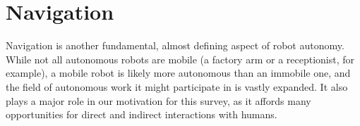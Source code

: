 \documentclass{sfuthesis}
\begin{document}





















\section{Navigation}

Navigation is another fundamental, almost defining aspect of robot autonomy. While not all autonomous robots are mobile (a factory arm or a receptionist, for example), a mobile robot is likely more autonomous than an immobile one, and the field of autonomous work it might participate in is vastly expanded. It also plays a major role in our motivation for this survey, as it affords many opportunities for direct and indirect interactions with humans.
\end{document}
